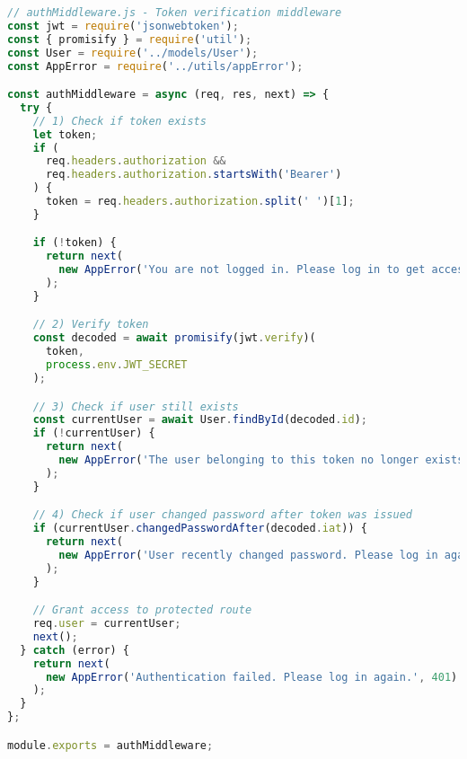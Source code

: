 \documentclass[12pt,a4paper]{article}
\begin{document}
\begin{lstlisting}[language=JavaScript]
// authMiddleware.js - Token verification middleware
const jwt = require('jsonwebtoken');
const { promisify } = require('util');
const User = require('../models/User');
const AppError = require('../utils/appError');

const authMiddleware = async (req, res, next) => {
  try {
    // 1) Check if token exists
    let token;
    if (
      req.headers.authorization &&
      req.headers.authorization.startsWith('Bearer')
    ) {
      token = req.headers.authorization.split(' ')[1];
    }

    if (!token) {
      return next(
        new AppError('You are not logged in. Please log in to get access.', 401)
      );
    }

    // 2) Verify token
    const decoded = await promisify(jwt.verify)(
      token,
      process.env.JWT_SECRET
    );

    // 3) Check if user still exists
    const currentUser = await User.findById(decoded.id);
    if (!currentUser) {
      return next(
        new AppError('The user belonging to this token no longer exists.', 401)
      );
    }

    // 4) Check if user changed password after token was issued
    if (currentUser.changedPasswordAfter(decoded.iat)) {
      return next(
        new AppError('User recently changed password. Please log in again.', 401)
      );
    }

    // Grant access to protected route
    req.user = currentUser;
    next();
  } catch (error) {
    return next(
      new AppError('Authentication failed. Please log in again.', 401)
    );
  }
};

module.exports = authMiddleware;
\end{lstlisting}
\end{document}
